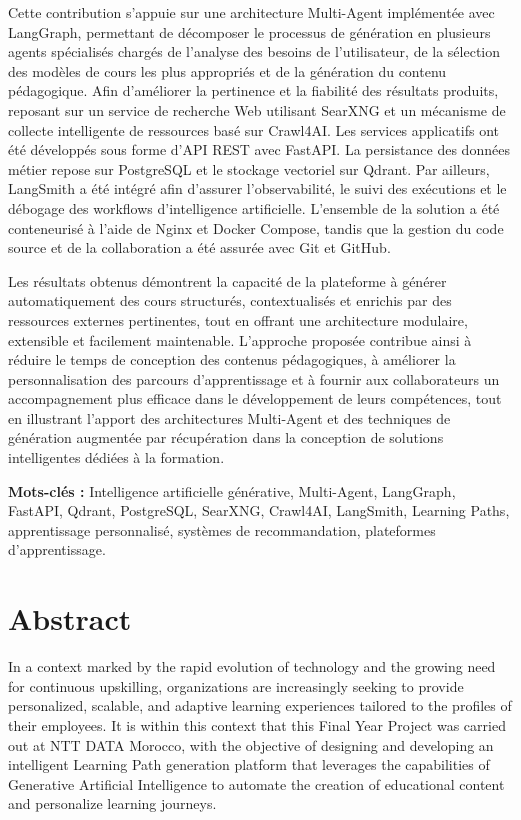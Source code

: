\documentclass[12pt,a4paper,oneside]{report}
\begin{document}
Cette contribution s'appuie sur une architecture Multi-Agent implémentée avec LangGraph, permettant de décomposer le processus de génération en plusieurs agents spécialisés chargés de l'analyse des besoins de l'utilisateur, de la sélection des modèles de cours les plus appropriés et de la génération du contenu pédagogique. Afin d'améliorer la pertinence et la fiabilité des résultats produits,  reposant sur un service de recherche Web utilisant SearXNG et un mécanisme de collecte intelligente de ressources basé sur Crawl4AI. Les services applicatifs ont été développés sous forme d'API REST avec FastAPI. La persistance des données métier repose sur PostgreSQL et le stockage vectoriel sur Qdrant. Par ailleurs, LangSmith a été intégré afin d'assurer l'observabilité, le suivi des exécutions et le débogage des workflows d'intelligence artificielle. L'ensemble de la solution a été conteneurisé à l'aide de Nginx et Docker Compose, tandis que la gestion du code source et de la collaboration a été assurée avec Git et GitHub.

Les résultats obtenus démontrent la capacité de la plateforme à générer automatiquement des cours structurés, contextualisés et enrichis par des ressources externes pertinentes, tout en offrant une architecture modulaire, extensible et facilement maintenable. L'approche proposée contribue ainsi à réduire le temps de conception des contenus pédagogiques, à améliorer la personnalisation des parcours d'apprentissage et à fournir aux collaborateurs un accompagnement plus efficace dans le développement de leurs compétences, tout en illustrant l'apport des architectures Multi-Agent et des techniques de génération augmentée par récupération dans la conception de solutions intelligentes dédiées à la formation.

\textbf{Mots-clés :} Intelligence artificielle générative, Multi-Agent, LangGraph, FastAPI, Qdrant, PostgreSQL, SearXNG, Crawl4AI, LangSmith, Learning Paths, apprentissage personnalisé, systèmes de recommandation, plateformes d'apprentissage.


\chapter*{Abstract}

In a context marked by the rapid evolution of technology and the growing need for continuous upskilling, organizations are increasingly seeking to provide personalized, scalable, and adaptive learning experiences tailored to the profiles of their employees. It is within this context that this Final Year Project was carried out at NTT DATA Morocco, with the objective of designing and developing an intelligent Learning Path generation platform that leverages the capabilities of Generative Artificial Intelligence to automate the creation of educational content and personalize learning journeys.
\end{document}
